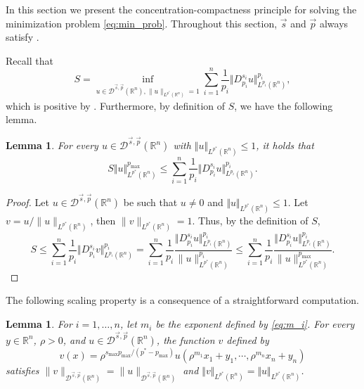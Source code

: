 \documentclass[11pt]{amsart}
\theoremstyle{plain}
\newtheorem{lemma}[theorem]{Lemma}
\theoremstyle{definition}
\numberwithin{equation}{section}
\newcommand{\R}{\mathbb{R}}
\newcommand{\Dsp}{\mathcal{D}^{\vec{s},\vec{p}}(\mathbb{R}^n)}
\begin{document}
In this section we present the concentration-compactness principle for solving the minimization problem \eqref{eq:min_prob}. 
Throughout this section, $\vec{s}$ and $\vec{p}$ always satisfy .

Recall that
\begin{equation*}
S= \inf_{u \in \mathcal{D}^{\vec{s},\vec{p}}(\mathbb{R}^n), \|u\|_{L^{p^\ast}(\mathbb{R}^n)}=1} \sum_{i=1}^n \frac{1}{p_i} \Vert D^{s_i}_{p_i}u\Vert_{L^{p_i}(\R^n)}^{p_i},
\end{equation*}
which is positive by . Furthermore, by definition of $S$, we have the following lemma.
\begin{lemma}
\label{lem:SobCor}
For every $u \in \Dsp$ with $\Vert u \Vert_{L^{p^{\ast}}(\R^n)} \le 1$, it holds that
\begin{equation*}
S \Vert u \Vert_{L^{p^{\ast}}(\R^n)}^{p_{\max}} \le \sum_{i=1}^n \frac{1}{p_i} \Vert D_{p_i}^{s_i} u \Vert_{L^{p_i}(\R^n)}^{p_i}.
\end{equation*}
\end{lemma}

\begin{proof}
Let $u \in \Dsp$ be such that $u \neq 0$ and $\Vert u \Vert_{L^{p^{\ast}}(\R^n)} \le 1$. Let $v = u/\|u\|_{L^{p^{\ast}}(\R^n)}$, then $\|v\|_{L^{p^{\ast}}(\R^n)} = 1$. Thus, by the definition of $S$,
\begin{equation*}
S \leq \sum_{i=1}^n \frac{1}{p_i} \Vert D_{p_i}^{s_i} v \Vert_{L^{p_i}(\R^n)}^{p_i} = \sum_{i=1}^n \frac{1}{p_i} \frac{\Vert D_{p_i}^{s_i} u \Vert_{L^{p_i}(\R^n)}^{p_i}}{\|u\|_{L^{p^{\ast}}(\R^n)}^{p_i}} \leq \sum_{i=1}^n \frac{1}{p_i} \frac{\Vert D_{p_i}^{s_i} u \Vert_{L^{p_i}(\R^n)}^{p_i}}{\|u\|_{L^{p^{\ast}}(\R^n)}^{p_{\max}}}.
\end{equation*}
\end{proof}
The following scaling property is a consequence of a straightforward computation.
\begin{lemma} \label{lem:scaling}
For $i=1,\dots,n$, let $m_i$ be the exponent defined by \eqref{eq:m_i}. For every $y \in \mathbb{R}^n$, $\rho > 0$, and $u \in \mathcal{D}^{\vec{s},\vec{p}}(\mathbb{R}^n)$, the function $v$ defined by
\begin{equation} \label{eq:v}
v(x) = \rho^{s_{\max}p_{\max}/(p^{\ast}-p_{\max})} u(\rho^{m_1}x_1+y_1, \cdots, \rho^{m_n}x_n+y_n)
\end{equation}
satisfies $\|v\|_{\mathcal{D}^{\vec{s},\vec{p}}(\mathbb{R}^n)} = \|u\|_{\mathcal{D}^{\vec{s},\vec{p}}(\mathbb{R}^n)}$ and $\Vert v \Vert_{L^{p^{\ast}}(\R^n)} = \Vert u \Vert_{L^{p^{\ast}}(\R^n)}$.
\end{lemma}
\end{document}

